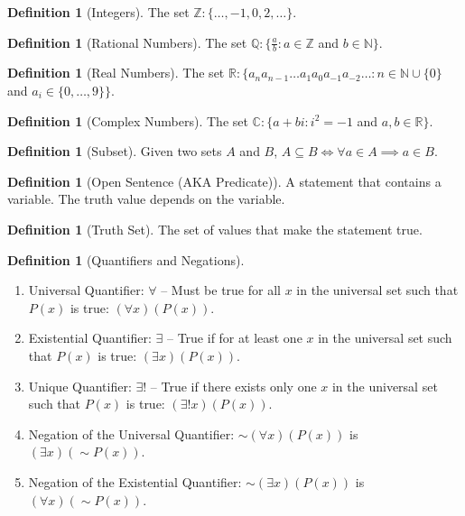 \documentclass[10pt]{article}
\theoremstyle{definition}
\newtheorem{definition}[equation]{Definition}
\newcommand{\N}{\mathbb{N}}
\newcommand{\Z}{\mathbb{Z}}
\newcommand{\R}{\mathbb{R}}
\begin{document}
\begin{definition}[Integers]
  The set $\Z: \{\dots, -1,0,2, \dots \}$.
\end{definition}

\begin{definition}[Rational Numbers]
  The set $\mathbb{Q}: \{\frac{a}{b}: a\in\Z$ and $b\in\N \}$.
\end{definition}


\begin{definition}[Real Numbers]
  The set $\R: \{a_n a_{n-1}\dots a_1a_0a_{-1}a_{-2} \dots:n\in\N\cup\{ 0\}$ and $a_i \in \{ 0,\dots,9\} \}$.
\end{definition}

\begin{definition}[Complex Numbers]
  The set $\mathbb{C}: \{a+bi:i^2 = -1$ and $a,b \in\R\}$.
\end{definition}

\begin{definition}[Subset]
  Given two sets $A$ and $B$, $A\subseteq B \iff \forall a\in A \implies a\in B$.
\end{definition}


\begin{definition}[Open Sentence (AKA Predicate)]
  A statement that contains a variable. The truth value depends on the variable.
\end{definition}

\begin{definition}[Truth Set]
  The set of values that make the statement true.
\end{definition}

\begin{definition}[Quantifiers and Negations]
  \begin{enumerate}
    \item Universal Quantifier: $\forall$ -- Must be true for all $x$ in the universal set such that  $P(x)$ is true: $(\forall x)(P(x))$.
    \item Existential Quantifier: $\exists$ -- True if for at least one $x$ in the universal set such that $P(x)$ is true: $(\exists x)(P(x))$.
    \item Unique Quantifier: $\exists!$ -- True if there exists only one $x$ in the universal set such that $P(x)$ is true: $(\exists! x)(P(x))$.
    \item Negation of the Universal Quantifier: $\sim(\forall x)(P(x))$ is $(\exists x)(\sim P(x))$.
    \item Negation of the Existential Quantifier: $\sim(\exists x)(P(x))$ is $(\forall x)(\sim P(x))$.
  \end{enumerate}
\end{definition}
\end{document}
